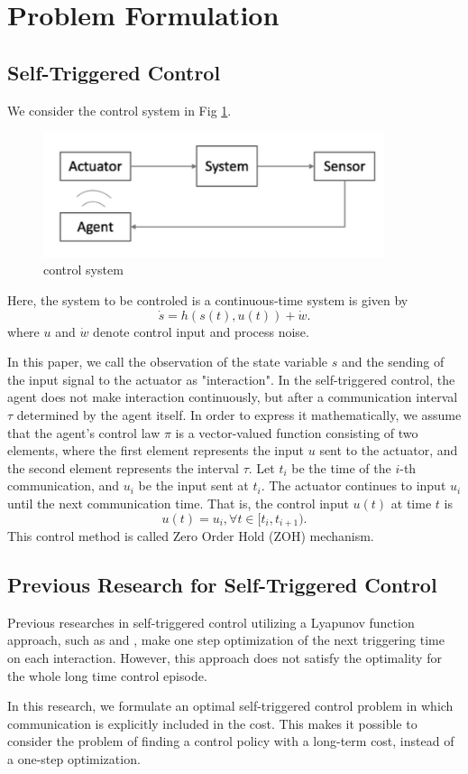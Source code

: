 \documentclass[english, dvipdfmx]{ampmt}             %
\begin{document}
\section{Problem Formulation}
\subsection{Self-Triggered Control}
We consider the control system in Fig \ref{image}.
\begin{figure}[t]
	\centering
 	\includegraphics[width=10cm]{event.png}
 	\caption{control system} \label{image}
\end{figure}
Here, the system to be controled is a continuous-time system is given by
\begin{equation}
	\dot{s} = h(s(t),u(t)) + \dot{w}\label{continuous_system}.
\end{equation}
where $u$ and $\dot{w}$ denote control input and process noise.\par
In this paper, we call the observation of the state variable $s$ and the sending of the input signal to the actuator as "interaction". In the self-triggered control, the agent does not make interaction continuously, but after a communication interval $\tau$ determined by the agent itself. In order to express it mathematically, we assume that the agent's control law $\pi$ is a vector-valued function consisting of two elements, where the first element represents the input $u$ sent to the actuator, and the second element represents the interval $\tau$. Let $t_i$ be the time of the $i$-th communication, and $u_i$ be the input sent at $t_i$. The actuator continues to input $u_i$ until the next communication time. That is, the control input $u(t)$ at time $t$ is 
\begin{equation}
	u(t) = u_i, \forall t \in [t_i, t_{i+1}).
\end{equation} 
This control method is called Zero Order Hold (ZOH) mechanism.

\subsection{Previous Research for Self-Triggered Control}
Previous researches in self-triggered control utilizing a Lyapunov function approach, such as \cite{STC} and \cite{ECBF}, make one step optimization of the next triggering time on each interaction.  However, this approach does not satisfy the optimality for the whole long time control episode. \par
In this research, we formulate an optimal self-triggered control problem in which communication is explicitly included in the cost. This makes it possible to consider the problem of finding a control policy with a long-term cost, instead of a one-step optimization.
\end{document}
